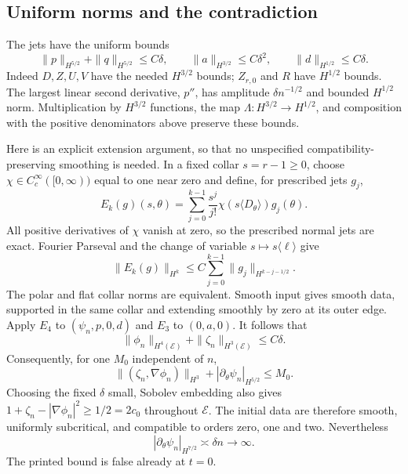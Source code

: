 \documentclass[10pt]{article}
\begin{document}
\subsection*{Uniform norms and the contradiction}
The jets have the uniform bounds \[\|p\|_{H^{5/2}}+\|q\|_{H^{5/2}}\le C\delta,\qquad
 \|a\|_{H^{3/2}}\le C\delta^2,\qquad
 \|d\|_{H^{1/2}}\le C\delta.\] Indeed \(D,Z,U,V\) have the needed \(H^{3/2}\) bounds; \(Z_{r,0}\) and \(R\) have \(H^{1/2}\) bounds. The largest linear second derivative, \(p''\), has amplitude \(\delta n^{-1/2}\) and bounded \(H^{1/2}\) norm. Multiplication by \(H^{3/2}\) functions, the map \(\Lambda:H^{3/2}\to H^{1/2}\), and composition with the positive denominators above preserve these bounds.\par
Here is an explicit extension argument, so that no unspecified compatibility-preserving smoothing is needed. In a fixed collar \(s=r-1\ge0\), choose \(\chi\in C_c^\infty([0,\infty))\) equal to one near zero and define, for prescribed jets \(g_j\), \[E_k(g)(s,\theta)=\sum_{j=0}^{k-1}\frac{s^j}{j!}
                     \chi(s\langle D_\theta\rangle)g_j(\theta).\] All positive derivatives of \(\chi\) vanish at zero, so the prescribed normal jets are exact. Fourier Parseval and the change of variable \(s\mapsto s\langle \ell\rangle\) give \[\|E_k(g)\|_{H^k}\le
 C\sum_{j=0}^{k-1}\|g_j\|_{H^{k-j-1/2}}.\] The polar and flat collar norms are equivalent. Smooth input gives smooth data, supported in the same collar and extending smoothly by zero at its outer edge. Apply \(E_4\) to \((\psi_n,p,0,d)\) and \(E_3\) to \((0,a,0)\). It follows that \[\|\phi_n\|_{H^4(\mathcal E)}+\|\zeta_n\|_{H^3(\mathcal E)}\le C\delta.\] Consequently, for one \(M_0\) independent of \(n\), \[\|(\zeta_n,\nabla\phi_n)\|_{H^3}
       +|\partial_\theta\psi_n|_{H^{5/2}}\le M_0.\] Choosing the fixed \(\delta\) small, Sobolev embedding also gives \(1+\zeta_n-|\nabla\phi_n|^2\ge1/2=2c_0\) throughout \(\mathcal E\). The initial data are therefore smooth, uniformly subcritical, and compatible to orders zero, one and two. Nevertheless \[|\partial_\theta\psi_n|_{H^{7/2}}\asymp\delta n\longrightarrow\infty.\] The printed bound is false already at \(t=0\).\par
\end{document}
